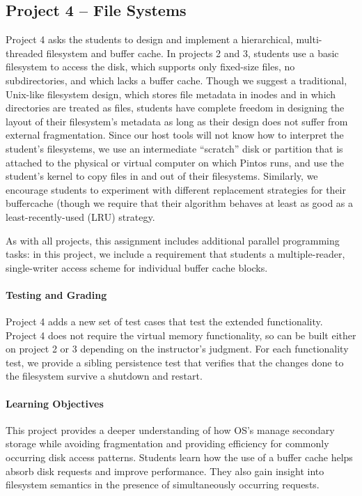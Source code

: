 \subsection{Project 4 -- File Systems}
Project 4 asks the students to design and implement a hierarchical, multi-threaded
filesystem and buffer cache.  In projects 2 and 3, students use a basic filesystem
to access the disk, which supports only fixed-size files, no subdirectories,
and which lacks a buffer cache.  
Though we suggest a traditional, Unix-like filesystem design, which stores file
metadata in inodes and in which directories are treated as files, students have
complete freedom in designing the layout of their filesystem's metadata as long
as their design does not suffer from external fragmentation.
Since our host tools will not know how to interpret the student's filesystems,
we use an intermediate ``scratch'' disk or partition that is attached to the 
physical or virtual computer on which Pintos runs, and use the student's kernel
to copy files in and out of their filesystems.
Similarly, we encourage students to experiment with different replacement
strategies for their buffercache (though we require that their algorithm
behaves at least as good as a least-recently-used (LRU) strategy.

As with all projects, this assignment includes additional parallel programming 
tasks: in this project, we include a requirement that students a multiple-reader, 
single-writer access scheme for individual buffer cache blocks.

\paragraph{Testing and Grading}
Project 4 adds a new set of test cases that test the extended functionality.
Project 4 does not require the virtual memory functionality, so can be built
either on project 2 or 3 depending on the instructor's judgment.
For each functionality test, we provide a sibling persistence test that verifies 
that the changes done to the filesystem survive a shutdown and restart.

\paragraph{Learning Objectives}
This project provides a deeper understanding of how OS's manage secondary storage
while avoiding fragmentation and providing efficiency for commonly occurring 
disk access patterns.  
Students learn how the use of a buffer cache helps absorb disk requests and
improve performance.
They also gain insight into filesystem semantics in the presence of simultaneously
occurring requests.

